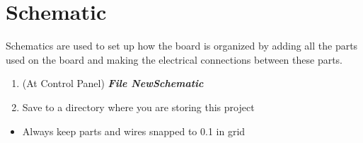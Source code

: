 \documentclass{article}
\begin{document}
\section{Schematic}
Schematics are used to set up how the board is organized by adding all the parts
used on the board and making the electrical connections between these parts.
\begin{enumerate}
    \item (At Control Panel) \textit{\textbf{File\textrightarrow
    New\textrightarrow Schematic}}
    \item Save to a directory where you are storing this project
\end{enumerate}
\begin{tcolorbox} [title=Tips \& Tricks]
    \begin{itemize}
        \item Always keep parts and wires snapped to 0.1 in grid
    \end{itemize}
\end{tcolorbox}
\end{document}
